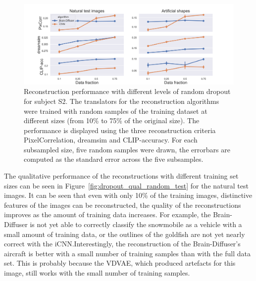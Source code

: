 \begin{figure}[ht]
  \centering
  \includegraphics[width=1\textwidth]{plots/dropout_random_reconstruction.png}
  \caption[Reconstruction Performance with increasing dropout]{Reconstruction performance with different levels of random dropout for subject S2. The translators for the reconstruction algorithms were trained with random samples of the training dataset at different sizes (from 10\% to 75\% of the original size). The performance is displayed using the three reconstruction criteria PixelCorrelation, dreamsim and CLIP-accuracy. For each subsampled size, five random samples were drawn, the errorbars are computed as the standard error across the five subsamples.}\label{fig:dropout_random_reconstruction}
\end{figure}

The qualitative performance of the reconstructions with different training set sizes can be seen in Figure~\ref{fig:dropout_qual_random_test} for the natural test images. It can be seen that even with only 10\% of the training images, distinctive features of the images can be reconstructed,  the quality of the reconstructions improves as the amount of training data increases. For example, the Brain-Diffuser is not yet able to correctly classify the snowmobile as a vehicle with a small amount of training data, or the outlines of the goldfish are not yet nearly correct with the iCNN.\@ Interestingly, the reconstruction of the Brain-Diffuser's aircraft is better with a small number of training samples than with the full data set. This is probably because the VDVAE, which produced artefacts for this image, still works with the small number of training samples. 

